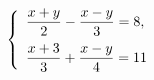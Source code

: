 \begin{ex}
	\begin{condition}
		\( \left\{
		\begin{array}{l}
			\dfrac{x+y}{2}-\dfrac{x-y}{3}=8,\vspace{0,2cm}\\
			\dfrac{x+3}{3}+\dfrac{x-y}{4}=11
		\end{array}
		\right. \)
	\end{condition}
\end{ex}